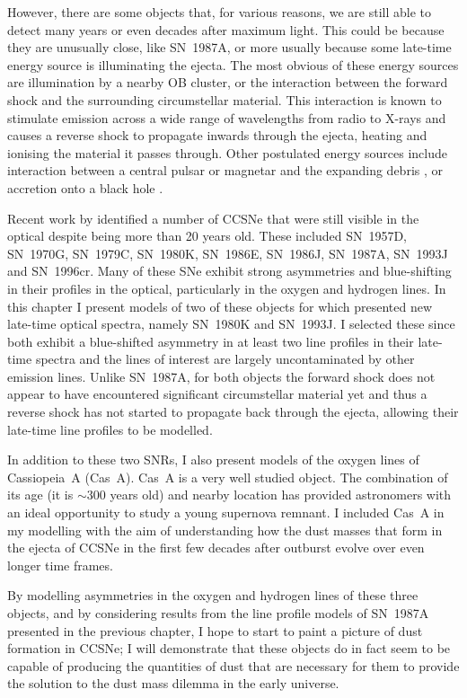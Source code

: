 However, there are some objects that, for various reasons, we are still able to detect many years or even decades after maximum light.  This could be because they are unusually close, like SN~1987A, or more usually because some late-time energy source is illuminating the ejecta.  The most obvious of these energy sources are illumination by a nearby OB cluster, or the interaction between the forward shock and the surrounding circumstellar material.  This interaction is known to stimulate emission across a wide range of wavelengths from radio to X-rays and causes a reverse shock to propagate inwards through the ejecta, heating and ionising the material it passes through.  Other postulated energy sources include interaction between a central pulsar or magnetar and the expanding debris \citep{Woosley2010}, or accretion onto a black hole \citep{Patnaude2001}.

Recent work by \citet{Milisavljevic2012} identified a number of CCSNe that were still visible in the optical despite being more than 20 years old.  These included SN~1957D, SN~1970G, SN~1979C, SN~1980K, SN~1986E, SN~1986J, SN~1987A, SN~1993J and SN~1996cr.  Many of these SNe exhibit strong asymmetries and blue-shifting in their profiles in the optical, particularly in the oxygen and hydrogen lines.  In this chapter I present models of two of these objects for which \citet{Milisavljevic2012} presented new late-time optical spectra, namely SN~1980K and SN~1993J.  I selected these since both exhibit a blue-shifted asymmetry in at least two line profiles in their late-time spectra and the lines of interest are largely uncontaminated by other emission lines.  Unlike SN~1987A, for both objects the forward shock does not appear to have encountered significant circumstellar material yet and thus a reverse shock has not  started to propagate back through the ejecta, allowing their late-time line profiles to be modelled.

In addition to these two SNRs, I also present models of the oxygen lines of Cassiopeia~A (Cas~A).  Cas~A is a very well studied object.  The combination of its age (it is $\sim300$ years old) and nearby location has provided astronomers with an ideal opportunity to study a young supernova remnant.  I included Cas~A in my modelling with the aim of understanding how the dust masses that form in the ejecta of CCSNe in the first few decades after outburst evolve over even longer time frames. 

By modelling asymmetries in the oxygen and hydrogen lines of these three objects, and by considering results from the line profile models of SN~1987A presented in the previous chapter, I hope to start to paint a picture of dust formation in CCSNe;  I will demonstrate that these objects do in fact seem to be capable of producing the quantities of dust that are necessary for them to provide the solution to the dust mass dilemma in the early universe.


